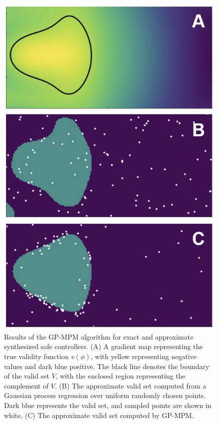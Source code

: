\documentclass{amsart}
\begin{document}
\begin{figure}[htbp]
        \centerline{\includegraphics[width=0.9\columnwidth]{img/exp_result.png}}
        \caption{Results of the GP-MPM algorithm for exact and approximate synthesized safe controllers. (A) A gradient map representing the true validity function $v(\phi)$, with yellow representing negative values and dark blue positive. The black line denotes the boundary of the valid set $V$, with the enclosed region representing the complement of $V$. (B) The approximate valid set computed from a Gaussian process regression over uniform randomly chosen points. Dark blue represents the valid set, and sampled points are shown in white. (C) The approximate valid set computed by GP-MPM.}
        \label{fig:expres}
    \end{figure}
\end{document}
